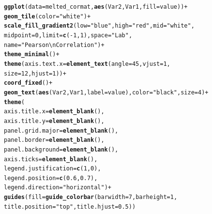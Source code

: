 \documentclass{article}\usepackage[]{graphicx}\usepackage[]{xcolor}
\makeatletter
\newcommand{\hlnum}[1]{\textcolor[rgb]{0.686,0.059,0.569}{#1}}%
\newcommand{\hlsng}[1]{\textcolor[rgb]{0.192,0.494,0.8}{#1}}%
\newcommand{\hlopt}[1]{\textcolor[rgb]{0,0,0}{#1}}%
\newcommand{\hldef}[1]{\textcolor[rgb]{0.345,0.345,0.345}{#1}}%
\newcommand{\hlkwc}[1]{\textcolor[rgb]{0.333,0.667,0.333}{#1}}%
\newcommand{\hlkwd}[1]{\textcolor[rgb]{0.737,0.353,0.396}{\textbf{#1}}}%
\newenvironment{kframe}{%
 \def\at@end@of@kframe{}%
 \ifinner\ifhmode%
  \def\at@end@of@kframe{\end{minipage}}%
  \begin{minipage}{\columnwidth}%
 \fi\fi%
 \def\FrameCommand##1{\hskip\@totalleftmargin \hskip-\fboxsep
 \colorbox{shadecolor}{##1}\hskip-\fboxsep
     \hskip-\linewidth \hskip-\@totalleftmargin \hskip\columnwidth}%
 \MakeFramed {\advance\hsize-\width
   \@totalleftmargin\z@ \linewidth\hsize
   \@setminipage}}%
 {\par\unskip\endMakeFramed%
 \at@end@of@kframe}
\newenvironment{knitrout}{}{} %
\makeatother
\begin{document}
\begin{knitrout}
\begin{kframe}
\begin{alltt}
\hlkwd{ggplot}\hldef{(}\hlkwc{data} \hldef{= melted_cormat,} \hlkwd{aes}\hldef{(Var2, Var1,} \hlkwc{fill} \hldef{= value))}\hlopt{+}
  \hlkwd{geom_tile}\hldef{(}\hlkwc{color} \hldef{=} \hlsng{"white"}\hldef{)}\hlopt{+}
  \hlkwd{scale_fill_gradient2}\hldef{(}\hlkwc{low} \hldef{=} \hlsng{"blue"}\hldef{,} \hlkwc{high} \hldef{=} \hlsng{"red"}\hldef{,} \hlkwc{mid} \hldef{=} \hlsng{"white"}\hldef{,}
                       \hlkwc{midpoint} \hldef{=} \hlnum{0}\hldef{,} \hlkwc{limit} \hldef{=} \hlkwd{c}\hldef{(}\hlopt{-}\hlnum{1}\hldef{,}\hlnum{1}\hldef{),} \hlkwc{space} \hldef{=} \hlsng{"Lab"}\hldef{,}
                       \hlkwc{name}\hldef{=}\hlsng{"Pearson\textbackslash{}nCorrelation"}\hldef{)} \hlopt{+}
  \hlkwd{theme_minimal}\hldef{()}\hlopt{+}
  \hlkwd{theme}\hldef{(}\hlkwc{axis.text.x} \hldef{=} \hlkwd{element_text}\hldef{(}\hlkwc{angle} \hldef{=} \hlnum{45}\hldef{,} \hlkwc{vjust} \hldef{=} \hlnum{1}\hldef{,}
                                   \hlkwc{size} \hldef{=} \hlnum{12}\hldef{,} \hlkwc{hjust} \hldef{=} \hlnum{1}\hldef{))}\hlopt{+}
  \hlkwd{coord_fixed}\hldef{()} \hlopt{+}
  \hlkwd{geom_text}\hldef{(}\hlkwd{aes}\hldef{(Var2, Var1,} \hlkwc{label} \hldef{= value),} \hlkwc{color} \hldef{=} \hlsng{"black"}\hldef{,} \hlkwc{size} \hldef{=} \hlnum{4}\hldef{)} \hlopt{+}
  \hlkwd{theme}\hldef{(}
    \hlkwc{axis.title.x} \hldef{=} \hlkwd{element_blank}\hldef{(),}
    \hlkwc{axis.title.y} \hldef{=} \hlkwd{element_blank}\hldef{(),}
    \hlkwc{panel.grid.major} \hldef{=} \hlkwd{element_blank}\hldef{(),}
    \hlkwc{panel.border} \hldef{=} \hlkwd{element_blank}\hldef{(),}
    \hlkwc{panel.background} \hldef{=} \hlkwd{element_blank}\hldef{(),}
    \hlkwc{axis.ticks} \hldef{=} \hlkwd{element_blank}\hldef{(),}
    \hlkwc{legend.justification} \hldef{=} \hlkwd{c}\hldef{(}\hlnum{1}\hldef{,} \hlnum{0}\hldef{),}
    \hlkwc{legend.position} \hldef{=} \hlkwd{c}\hldef{(}\hlnum{0.6}\hldef{,} \hlnum{0.7}\hldef{),}
    \hlkwc{legend.direction} \hldef{=} \hlsng{"horizontal"}\hldef{)}\hlopt{+}
  \hlkwd{guides}\hldef{(}\hlkwc{fill} \hldef{=} \hlkwd{guide_colorbar}\hldef{(}\hlkwc{barwidth} \hldef{=} \hlnum{7}\hldef{,} \hlkwc{barheight} \hldef{=} \hlnum{1}\hldef{,}
                               \hlkwc{title.position} \hldef{=} \hlsng{"top"}\hldef{,} \hlkwc{title.hjust} \hldef{=} \hlnum{0.5}\hldef{))}
\end{alltt}
\end{kframe}\begin{figure}[H]

\end{figure}
\end{knitrout}
\end{document}
